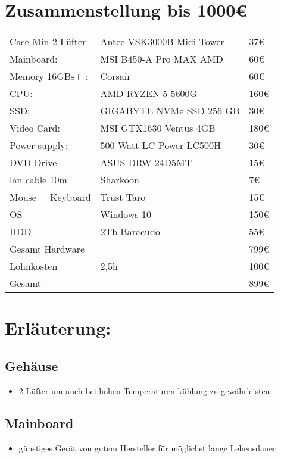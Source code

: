 \section{Zusammenstellung bis 1000€}
\label{sec:org40f266c}
\begin{center}
\begin{tabular}{lll}
\hline
Case Min 2 Lüfter & Antec VSK3000B Midi Tower & 37€\\
Mainboard: & MSI B450-A Pro MAX AMD & 60€\\
Memory 16GBs+ : & Corsair & 60€\\
CPU: & AMD RYZEN 5 5600G & 160€\\
SSD: & GIGABYTE NVMe SSD 256 GB & 30€\\
Video Card: & MSI GTX1630 Ventus 4GB & 180€\\
Power supply: & 500 Watt LC-Power LC500H & 30€\\
DVD Drive & ASUS DRW-24D5MT & 15€\\
lan cable 10m & Sharkoon & 7€\\
Mouse + Keyboard & Trust Taro & 15€\\
OS & Windows 10 & 150€\\
HDD & 2Tb Baracudo & 55€\\
\hline
Gesamt Hardware &  & 799€\\
Lohnkosten & 2,5h & 100€\\
\hline
Gesamt &  & 899€\\
\hline
\end{tabular}
\end{center}

\section{Erläuterung:}
\label{sec:org62e6405}
\subsection{Gehäuse}
\label{sec:org6c925f2}
\begin{itemize}
\item 2 Lüfter um auch bei hohen Temperaturen kühlung zu gewährleisten
\end{itemize}
\subsection{Mainboard}
\label{sec:org0789bac}
\begin{itemize}
\item günstiges Gerät von gutem Hersteller für möglichst lange Lebensdauer
\end{itemize}
